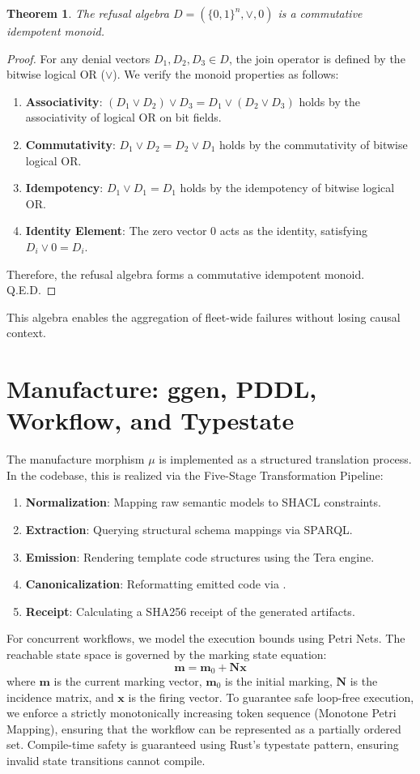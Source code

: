 \documentclass[11pt,a4paper]{article}
\newtheorem{theorem}{Theorem}
\begin{document}
\begin{theorem}
The refusal algebra $D = (\{0,1\}^n, \lor, 0)$ is a commutative idempotent monoid.
\end{theorem}
\begin{proof}
For any denial vectors $D_1, D_2, D_3 \in D$, the join operator is defined by the bitwise logical OR ($\lor$). We verify the monoid properties as follows:
\begin{enumerate}
    \item \textbf{Associativity}: $(D_1 \lor D_2) \lor D_3 = D_1 \lor (D_2 \lor D_3)$ holds by the associativity of logical OR on bit fields.
    \item \textbf{Commutativity}: $D_1 \lor D_2 = D_2 \lor D_1$ holds by the commutativity of bitwise logical OR.
    \item \textbf{Idempotency}: $D_1 \lor D_1 = D_1$ holds by the idempotency of bitwise logical OR.
    \item \textbf{Identity Element}: The zero vector $0$ acts as the identity, satisfying $D_i \lor 0 = D_i$.
\end{enumerate}
Therefore, the refusal algebra forms a commutative idempotent monoid. Q.E.D.
\end{proof}
This algebra enables the aggregation of fleet-wide failures without losing causal context.

\section{Manufacture: ggen, PDDL, Workflow, and Typestate}
The manufacture morphism $\mu$ is implemented as a structured translation process. In the  codebase, this is realized via the Five-Stage Transformation Pipeline:
\begin{enumerate}
    \item \textbf{Normalization}: Mapping raw semantic models to SHACL constraints.
    \item \textbf{Extraction}: Querying structural schema mappings via SPARQL.
    \item \textbf{Emission}: Rendering template code structures using the Tera engine.
    \item \textbf{Canonicalization}: Reformatting emitted code via .
    \item \textbf{Receipt}: Calculating a SHA256 receipt of the generated artifacts.
\end{enumerate}

For concurrent workflows, we model the execution bounds using Petri Nets. The reachable state space is governed by the marking state equation:
\begin{equation}
\bm{m} = \bm{m}_0 + \mathbf{N}\bm{x}
\end{equation}
where $\bm{m}$ is the current marking vector, $\bm{m}_0$ is the initial marking, $\mathbf{N}$ is the incidence matrix, and $\bm{x}$ is the firing vector. To guarantee safe loop-free execution, we enforce a strictly monotonically increasing token sequence (Monotone Petri Mapping), ensuring that the workflow can be represented as a partially ordered set. Compile-time safety is guaranteed using Rust's typestate pattern, ensuring invalid state transitions cannot compile.
\end{document}
